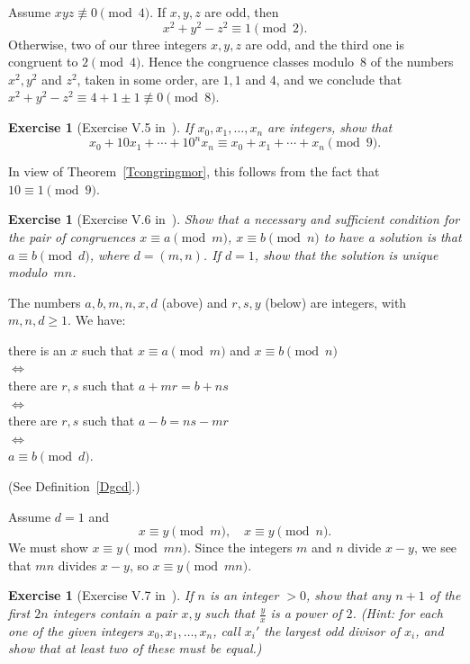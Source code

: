 \documentclass[12pt,letterpaper]{article}
\newtheorem{exer}[thm]{Exercise}
\theoremstyle{definition}
\begin{document}
Assume $xyz \not\equiv 0 \pmod{4}$. If $x,y,z$ are odd, then 
$$
x^2+y^2-z^2 \equiv 1 \pmod{2}.
$$ 
Otherwise, two of our three integers $x, y, z$ are odd, and the third one is congruent to $2 \pmod{4}$. Hence the congruence classes modulo~$8$ of the numbers $x^2, y^2$ and $z^2$, taken in some order, are $1,1$ and $4$, and we conclude that $x^2+y^2-z^2 \equiv 4+1\pm1 \not\equiv 0 \pmod{8}$. 

\begin{exer}[Exercise V.5 in~\cite{weil1979}]
If $x_0,x_1,\ldots,x_n$ are integers, show that
\[
x_0+10x_1+\cdots+10^nx_n\equiv x_0+x_1+\cdots+x_n \pmod 9.
\]
\end{exer}

In view of Theorem~\ref{Tcongringmor}, this follows from the fact that $10 \equiv 1 \pmod{9}$. 

\begin{exer}[Exercise V.6 in~\cite{weil1979}]\label{ExV6}
Show that a necessary and sufficient condition for the pair of congruences $x \equiv a \pmod{m}$, $x \equiv b \pmod{n}$ to have a solution is that $a \equiv b \pmod{d}$, where $d=(m,n)$. If $d=1$, show that the solution is unique modulo~$mn$. 
\end{exer} 

The numbers $a,b,m,n,x,d$ (above) and $r,s,y$ (below) are integers, with $m,n,d\ge1$. We have: 
\begin{center}
there is an $x$ such that $x \equiv a \pmod{m}$ and $x \equiv b \pmod{n}$ \\
$\iff$ \\
there are $r,s$ such that $a+mr=b+ns$ \\ 
$\iff$ \\
there are $r,s$ such that $a-b=ns-mr$ \\ 
$\iff$ \\
$a \equiv b \pmod{d}$. 
\end{center} 
(See Definition~\ref{Dgcd}.) 

Assume $d=1$ and
$$
x\equiv y\pmod{m},\quad x\equiv y\pmod{n}.
$$ 
We must show $x\equiv y\pmod{mn}$. Since the integers $m$ and $n$ divide $x-y$, we see that $mn$ divides $x-y$, so $x\equiv y\pmod{mn}$. 

\begin{exer}[Exercise V.7 in~\cite{weil1979}]
If $n$ is an integer $>0$, show that any $n+1$ of the first $2n$ integers contain a pair $x,y$ such that $\frac{y}{x}$ is a power of $2$. (Hint: for each one of the given integers $x_0,x_1,\ldots,x_n$, call $x_i'$ the largest odd divisor of $x_i$, and show that at least two of these must be equal.)
\end{exer}
\end{document}
